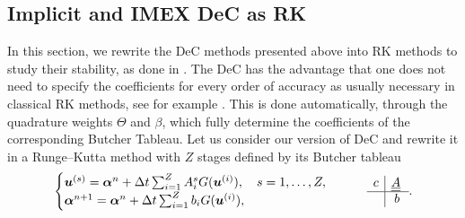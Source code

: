 \subsection{Implicit and IMEX DeC as RK}
In this section, we rewrite the DeC methods presented above into RK methods to study their stability, as done in \cite{torlo2022}. 
The DeC has the advantage that one does not need to specify the coefficients for every order of accuracy as usually necessary in classical RK methods, see for example \cite[Remark 4.3]{abgrall2018asymptotic}.
This is done automatically, through the quadrature weights $\Theta$ and $\beta$, which fully determine the coefficients of the corresponding Butcher Tableau. 
Let us consider our version of DeC and rewrite it in a Runge--Kutta method with $Z$ stages defined by its Butcher tableau
\begin{equation}
	\begin{cases}
		\bu^{(s)} = \bc^n +\Delta t \sum_{i=1}^{Z} A_i^s G(\bu^{(i)}),\quad s=1,\dots, Z,\\
		\bc^{n+1} = \bc^n +\Delta t \sum_{i=1}^Z b_i  G(\bu^{(i)}),
	\end{cases} \qquad \begin{array}{c | c}
	c& \mat{A}
	\\ \hline
	& b
	\end{array}.
\end{equation}

